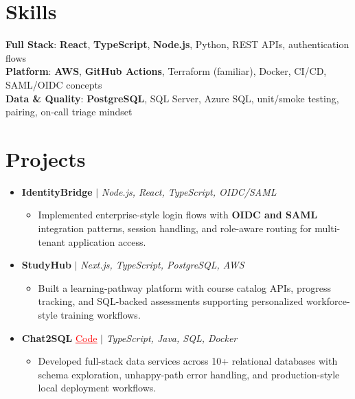 \documentclass[letterpaper,10pt]{article}
\newcommand{\resumeItem}[1]{\item\small{{#1 \vspace{-2pt}}}}
\newcommand{\resumeProjectHeading}[1]{\item \small #1 \vspace{-2pt}}
\newcommand{\resumeSubHeadingListStart}{\begin{itemize}[leftmargin=0.0in, label={}]}
\newcommand{\resumeSubHeadingListEnd}{\end{itemize}}
\newcommand{\resumeProjItemListStart}{\begin{itemize}[leftmargin=0.15in,label=\textbullet,itemsep=0pt,topsep=0pt,parsep=0pt,partopsep=0pt]}
\newcommand{\resumeProjItemListEnd}{\end{itemize}\vspace{-4pt}}
\begin{document}
\section{Skills}
\begin{itemize}[leftmargin=0.15in, label={}]
\small{\item{
\textbf{Full Stack}: \textbf{React}, \textbf{TypeScript}, \textbf{Node.js}, Python, REST APIs, authentication flows \\
\textbf{Platform}: \textbf{AWS}, \textbf{GitHub Actions}, Terraform (familiar), Docker, CI/CD, SAML/OIDC concepts \\
\textbf{Data \& Quality}: \textbf{PostgreSQL}, SQL Server, Azure SQL, unit/smoke testing, pairing, on-call triage mindset
}}
\end{itemize}
\vspace{-16pt}
\section{Projects}
\resumeSubHeadingListStart
\vspace{-2pt}
\resumeProjectHeading{\textbf{IdentityBridge} $|$ \emph{Node.js, React, TypeScript, OIDC/SAML}}
\resumeProjItemListStart
\resumeItem{Implemented enterprise-style login flows with \textbf{OIDC and SAML} integration patterns, session handling, and role-aware routing for multi-tenant application access.}
\resumeProjItemListEnd
\vspace{3pt}
\resumeProjectHeading{\textbf{StudyHub} $|$ \emph{Next.js, TypeScript, PostgreSQL, AWS}}
\resumeProjItemListStart
\resumeItem{Built a learning-pathway platform with course catalog APIs, progress tracking, and SQL-backed assessments supporting personalized workforce-style training workflows.}
\resumeProjItemListEnd
\vspace{3pt}
\resumeProjectHeading{\textbf{Chat2SQL} {\href{https://github.com/SAHAJ-BHADJA/Chat2SQL}{\textcolor{red}{\underline{Code}}}} $|$ \emph{TypeScript, Java, SQL, Docker}}
\resumeProjItemListStart
\resumeItem{Developed full-stack data services across 10+ relational databases with schema exploration, unhappy-path error handling, and production-style local deployment workflows.}
\resumeProjItemListEnd
\resumeSubHeadingListEnd
\end{document}
